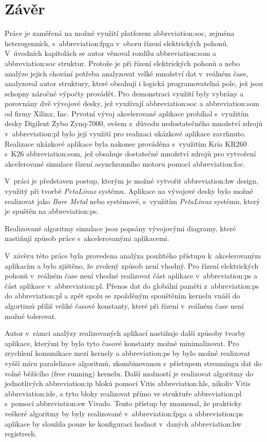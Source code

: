\documentclass[a4paper, twoside, 11pt]{article}
\begin{document}
\section*{Závěr}
Práce je zaměřená na možné využití platforem \gls{abbreviation:soc}, zejména heterogenních, s~\gls{abbreviation:fpga} v~oboru řízení elektrických pohonů. V~úvodních kapitolách se autor věnoval rozdílu \gls{abbreviation:som} a \gls{abbreviation:soc} struktur. Protože je při řízení elektrických pohonů a nebo analýze jejich chování potřeba analyzovat velké množství dat v~reálném čase, analyzoval autor struktury, které obsahují i logická programovatelná pole, jež jsou schopny náročné výpočty provádět. Pro demonstraci využití byly vybrány a porovnány dvě vývojové desky, jež využívají \gls{abbreviation:soc} a \gls{abbreviation:som} od firmy Xilinx, Inc. Prvotní vývoj akcelerované aplikace probíhal s~využitím desky Digilent Zybo Zynq-7000, ovšem z~důvodu nedostatečného množství zdrojů v~\gls{abbreviation:pl} bylo její využití pro realizaci ukázkové aplikace zavrhnuto. Realizace ukázkové aplikace byla nakonec prováděna s~využitím Kria KR260 s~K26 \gls{abbreviation:som}, jež obsahuje dostatečné množství zdrojů pro vytvoření akcelerované simulace řízení asynchronního motoru pomocí \gls{abbreviation:foc}.\par
V~práci je představen postup, kterým je možné vytvořit \gls{abbreviation:hw} design, využitý při tvorbě \textit{PetaLinux} systému. Aplikace na vývojové desky bylo možné realizovat jako \textit{Bare Metal} nebo systémové, s~využitím \textit{PetaLinux} systému, který je spuštěn na \gls{abbreviation:ps}.\par
Realizované algoritmy simulace jsou popsány vývojovými diagramy, které nastiňují způsob práce s~akcelerovanými aplikacemi.\par
V~závěru této práce byla provedena analýza použitého přístupu k~akcelerovaným aplikacím a bylo zjištěno, že zvolený způsob není vhodný. Pro řízení elektrických pohonů v~reálném čase není vhodné realizovat část aplikace v~\gls{abbreviation:ps} a část aplikace v~\gls{abbreviation:pl}. Přenos dat do globální paměti z~\gls{abbreviation:ps} do \gls{abbreviation:pl} a zpět spolu se zpožděným spouštěním kernelu vnáší do algortimů přiliš veliké časové konstanty, které při řízení v~reálném čase není možné tolerovat.\par
Autor v~rámci analýzy realizovaných aplikací nastiňuje další způsoby tvorby aplikace, kterými by bylo tyto časové konstanty možné minimalizovat. Pro zrychlení komunikace mezi kernely a \gls{abbreviation:ps} by bylo možné realizovat vyšší míru paralelizace algoritmů, zkombinovanou s~přístupem streamingu dat do volně běžícího (free running) kernelu. Další možností je realizovat algoritmy do jednotlivých \gls{abbreviation:ip} bloků pomocí Vitis \gls{abbreviation:hls}, nikoliv Vitis \gls{abbreviation:ide}, a tyto bloky realizovat přímo ve struktuře \gls{abbreviation:pl} s~pomocí \gls{abbreviation:sw} Vivado. Tento přístup by znamenal, že prakticky veškeré algoritmy by byly realizované v~\gls{abbreviation:fpga} a \gls{abbreviation:ps} aplikace by sloužila pouze ke konfiguraci hodnot v~daných \gls{abbreviation:hw} registrech.\par
\end{document}
